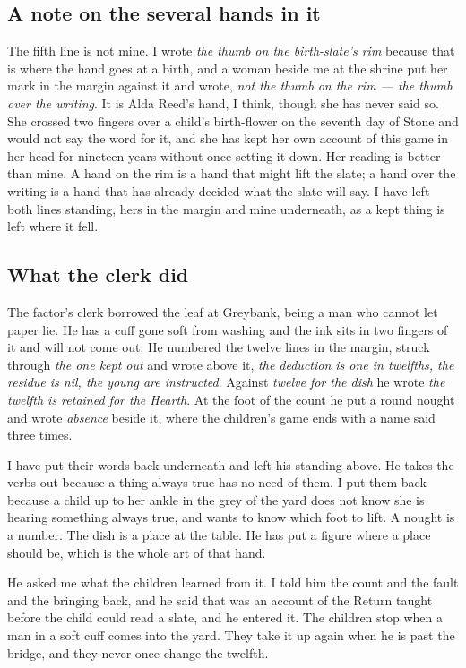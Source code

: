 \documentclass{design/chronicle}
\begin{document}
\subsection*{A note on the several hands in it}

The fifth line is not mine. I wrote \emph{the thumb on the birth-slate’s rim} because that is where the hand goes at a birth, and a woman beside me at the shrine put her mark in the margin against it and wrote, \emph{not the thumb on the rim — the thumb over the writing}. It is Alda Reed’s hand, I think, though she has never said so. She crossed two fingers over a child’s birth-flower on the seventh day of Stone and would not say the word for it, and she has kept her own account of this game in her head for nineteen years without once setting it down. Her reading is better than mine. A hand on the rim is a hand that might lift the slate; a hand over the writing is a hand that has already decided what the slate will say. I have left both lines standing, hers in the margin and mine underneath, as a kept thing is left where it fell.

\subsection*{What the clerk did}

The factor’s clerk borrowed the leaf at Greybank, being a man who cannot let paper lie. He has a cuff gone soft from washing and the ink sits in two fingers of it and will not come out. He numbered the twelve lines in the margin, struck through \emph{the one kept out} and wrote above it, \emph{the deduction is one in twelfths, the residue is nil, the young are instructed}. Against \emph{twelve for the dish} he wrote \emph{the twelfth is retained for the Hearth}. At the foot of the count he put a round nought and wrote \emph{absence} beside it, where the children’s game ends with a name said three times.

I have put their words back underneath and left his standing above. He takes the verbs out because a thing always true has no need of them. I put them back because a child up to her ankle in the grey of the yard does not know she is hearing something always true, and wants to know which foot to lift. A nought is a number. The dish is a place at the table. He has put a figure where a place should be, which is the whole art of that hand.

He asked me what the children learned from it. I told him the count and the fault and the bringing back, and he said that was an account of the Return taught before the child could read a slate, and he entered it. The children stop when a man in a soft cuff comes into the yard. They take it up again when he is past the bridge, and they never once change the twelfth.
\end{document}
